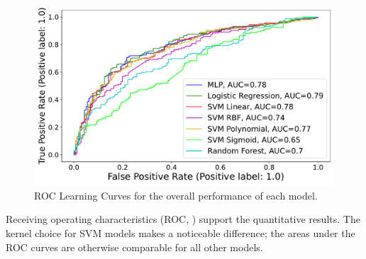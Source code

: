 



\begin{figure}[ht]
\centering
\includegraphics[width=8.cm]{plots/chiang7.pdf}
\caption{ROC Learning Curves for the overall performance of each model.}

\label{fig:roc}
\end{figure}


Receiving operating characteristics (ROC, ) support the quantitative results. The kernel choice for SVM models makes a noticeable difference; the areas under the ROC curves are otherwise comparable for all other models.

